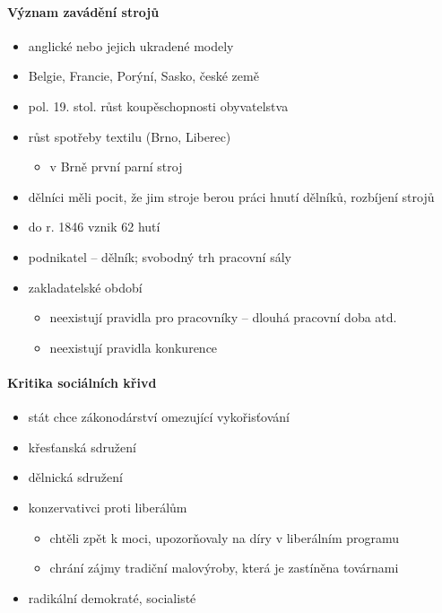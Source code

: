 \paragraph{Význam zavádění strojů}
\begin{itemize}
\item anglické nebo jejich ukradené modely 
\item Belgie, Francie, Porýní, Sasko, české země
\item pol. 19. stol. \ra růst koupěschopnosti obyvatelstva
\item růst spotřeby textilu (Brno, Liberec)
	\begin{itemize}
	\item v Brně první parní stroj
	\end{itemize}
\item dělníci měli pocit, že jim stroje berou práci \ra hnutí dělníků, rozbíjení strojů
\item do r. 1846 vznik 62 hutí
\item podnikatel -- dělník; svobodný trh pracovní sály
\item zakladatelské období
	\begin{itemize}
	\item neexistují pravidla pro pracovníky -- dlouhá pracovní doba atd.
	\item neexistují pravidla konkurence
	\end{itemize}
\end{itemize}

\paragraph{Kritika sociálních křivd}
\begin{itemize}
\item stát chce zákonodárství omezující vykořisťování
\item křesťanská sdružení
\item dělnická sdružení
\item konzervativci proti liberálům
	\begin{itemize}
	\item chtěli zpět k moci, upozorňovaly na díry v liberálním programu
	\item chrání zájmy tradiční malovýroby, která je zastíněna továrnami
	\end{itemize}
\item radikální demokraté, socialisté
\end{itemize}

